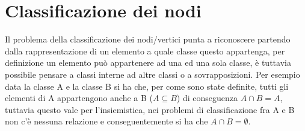\section{Classificazione dei nodi}
Il problema della classificazione dei nodi/vertici punta a riconoscere partendo dalla rappresentazione di un elemento a quale classe questo appartenga, per definizione un elemento può appartenere ad una ed una sola classe, è tuttavia possibile pensare a classi interne ad altre classi o a sovrapposizioni. Per esempio data la classe A e la classe B si ha che, per come sono state definite, tutti gli elementi di A appartengono anche a B ($\displaystyle A \subseteq B$) di conseguenza $\displaystyle A \cap B = A$, tuttavia questo vale per l'insiemistica, nei problemi di classificazione fra A e B non c'è nessuna relazione e conseguentemente si ha che $\displaystyle A \cap B = \emptyset$.%
%
